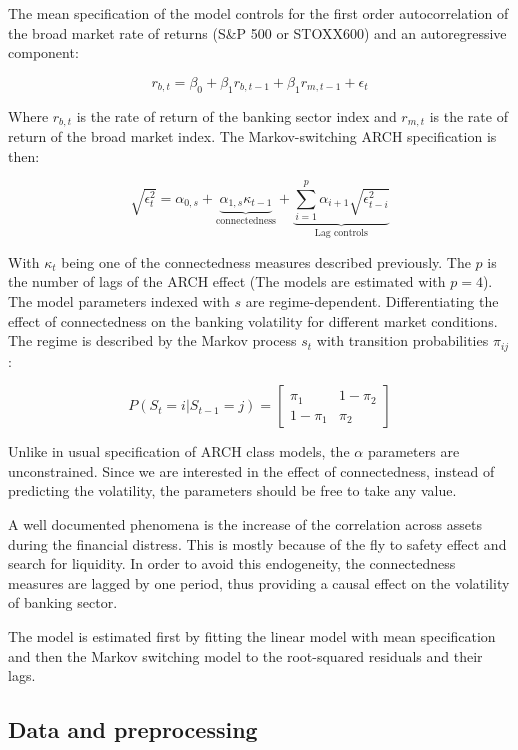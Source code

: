 \documentclass{article}
\begin{document}
The mean specification of the model controls for the first order autocorrelation of the broad market rate of returns (S\&P 500 or STOXX600) and an autoregressive component:

\[r_{b,t} = \beta_0 + \beta_1 r_{b,t-1} + \beta_1 r_{m,t-1} + \epsilon_t\]

Where $r_{b,t}$ is the rate of return of the banking sector index and $r_{m,t}$ is the rate of return of the broad market index. The Markov-switching ARCH specification is then:

\[\sqrt{\epsilon^2_t} = \alpha_{0,s} + \underbrace{\alpha_{1,s}\kappa_{t-1}}_{\text{connectedness}} + \underbrace{\sum_{i=1}^{p} \alpha_{i+1} \sqrt{\epsilon^2_{t-i}}}_{\text{Lag controls}}\]

With $\kappa_t$ being one of the connectedness measures described previously. The $p$ is the number of lags of the ARCH effect (The models are estimated with $p = 4$). The model parameters indexed with $s$ are regime-dependent. Differentiating the effect of connectedness on the banking volatility for different market conditions. The regime is described by the Markov process $s_t$ with transition probabilities $\pi_{ij}$:

\begin{equation*}
  P(S_t = i | S_{t-1} = j) = \begin{bmatrix}
    \pi_1 & 1 - \pi_2\\
      1 - \pi_1 & \pi_2
      \end{bmatrix}
\end{equation*}

Unlike in usual specification of ARCH class models, the $\alpha$ parameters are unconstrained. Since we are interested in the effect of connectedness, instead of predicting the volatility, the parameters should be free to take any value.

A well documented phenomena is the increase of the correlation across assets during the financial distress. This is mostly because of the fly to safety effect and search for liquidity. In order to avoid this endogeneity, the connectedness measures are lagged by one period, thus providing a causal effect on the volatility of banking sector.

The model is estimated first by fitting the linear model with mean specification and then the Markov switching model to the root-squared residuals and their lags. 

\subsection*{Data and preprocessing}
\end{document}
